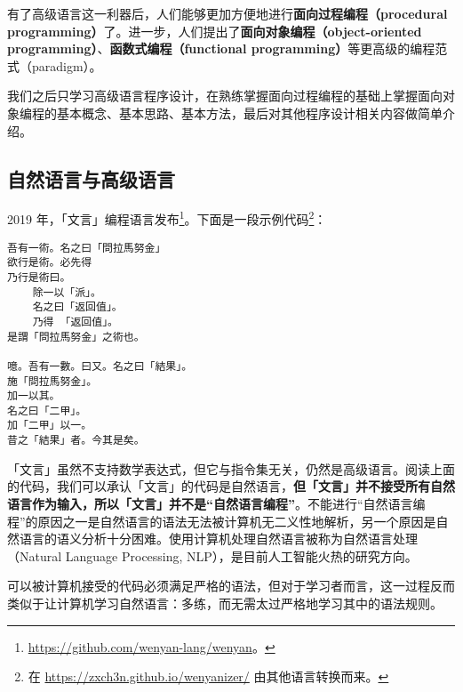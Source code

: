 有了高级语言这一利器后，人们能够更加方便地进行\textbf{面向过程编程（procedural programming）}了。进一步，人们提出了\textbf{面向对象编程（object-oriented programming）}、\textbf{函数式编程（functional programming）}等更高级的编程范式（paradigm）。

我们之后只学习高级语言程序设计，在熟练掌握面向过程编程的基础上掌握面向对象编程的基本概念、基本思路、基本方法，最后对其他程序设计相关内容做简单介绍。

\subsection{自然语言与高级语言}

2019 年，「文言」编程语言发布\footnote{\url{https://github.com/wenyan-lang/wenyan}。}。下面是一段示例代码\footnote{在 \url{https://zxch3n.github.io/wenyanizer/} 由其他语言转换而来。}：

\begin{lstlisting}[language={}, numbers=none]
吾有一術。名之曰「問拉馬努金」
欲行是術。必先得
乃行是術曰。
	除一以「派」。
	名之曰「返回值」。
	乃得 「返回值」。
是謂「問拉馬努金」之術也。

噫。吾有一數。曰又。名之曰「結果」。
施「問拉馬努金」。
加一以其。
名之曰「二甲」。
加「二甲」以一。
昔之「結果」者。今其是矣。
\end{lstlisting}

「文言」虽然不支持数学表达式，但它与指令集无关，仍然是高级语言。阅读上面的代码，我们可以承认「文言」的代码是自然语言，\textbf{但「文言」并不接受所有自然语言作为输入，所以「文言」并不是“自然语言编程”}。不能进行“自然语言编程”的原因之一是自然语言的语法无法被计算机无二义性地解析，另一个原因是自然语言的语义分析十分困难。使用计算机处理自然语言被称为自然语言处理（Natural Language Processing, NLP），是目前人工智能火热的研究方向。

可以被计算机接受的代码必须满足严格的语法，但对于学习者而言，这一过程反而类似于让计算机学习自然语言：多练，而无需太过严格地学习其中的语法规则。

\pagebreak